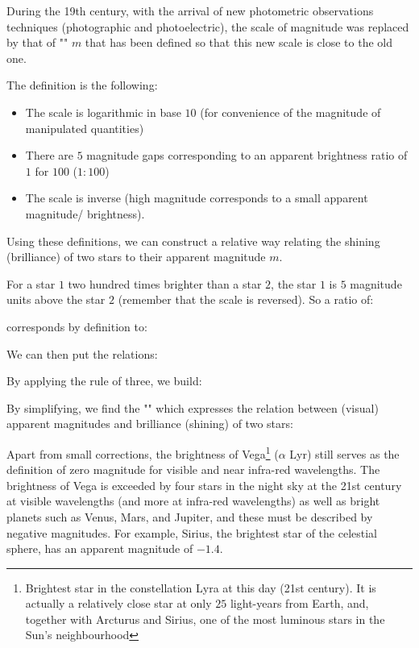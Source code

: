 	During the 19th century, with the arrival of new photometric observations techniques (photographic and photoelectric), the scale of magnitude was replaced by that of "" $m$ that has been defined so that this new scale is close to the old one.

	The definition is the following:
	\begin{itemize}
		\item The scale is logarithmic in base $10$ (for convenience of the magnitude of manipulated quantities)

		\item There are $5$ magnitude gaps corresponding to an apparent brightness ratio of $1$ for $100$ ($1: 100$)

		\item The scale is inverse (high magnitude corresponds to a small apparent magnitude/ brightness).
	\end{itemize}
	Using these definitions, we can construct a relative way relating the shining (brilliance) of two stars to their apparent magnitude $m$.

	For a star $1$ two hundred times brighter than a star $2$, the star $1$ is $5$ magnitude  units above the star $2$ (remember that the scale is reversed). So a ratio of:
	
	corresponds by definition to:
	
	We can then put the relations:
	
	By applying the rule of three, we build:
	
	By simplifying, we find the "" which expresses the relation between (visual) apparent  magnitudes and brilliance (shining) of two stars:
	
	Apart from small corrections, the brightness of Vega\footnote{Brightest star in the constellation Lyra at this day (21st century). It is actually a relatively close star at only $25$ light-years from Earth, and, together with Arcturus and Sirius, one of the most luminous stars in the Sun's neighbourhood} ($\alpha$ Lyr) still serves as the definition of zero magnitude for visible and near infra-red wavelengths. The brightness of Vega is exceeded by four stars in the night sky at the 21st century at visible wavelengths (and more at infra-red wavelengths) as well as bright planets such as Venus, Mars, and Jupiter, and these must be described by negative magnitudes. For example, Sirius, the brightest star of the celestial sphere, has an apparent magnitude of $-1.4$.
	
